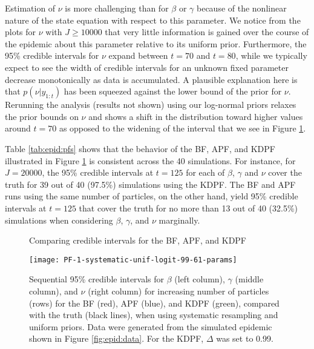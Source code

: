 Estimation of $\nu$ is more challenging than for $\beta$ or $\gamma$ because of the nonlinear nature of the state equation with respect to this parameter. We notice from the plots for $\nu$ with $J \ge 10000$ that very little information is gained over the course of the epidemic about this parameter relative to its uniform prior. Furthermore, the 95\% credible intervals for $\nu$ expand between $t = 70$ and $t = 80$, while we typically expect to see the width of credible intervals for an unknown fixed parameter decrease monotonically as data is accumulated. A plausible explanation here is that $p(\nu|y_{1:t})$ has been squeezed against the lower bound of the prior for $\nu$. Rerunning the analysis (results not shown) using our log-normal priors relaxes the prior bounds on $\nu$ and shows a shift in the distribution toward higher values around $t = 70$ as opposed to the widening of the interval that we see in Figure \ref{fig:epid:pfs}.

Table \ref{tab:epid:pfs} shows that the behavior of the BF, APF, and KDPF illustrated in Figure \ref{fig:epid:pfs} is consistent across the 40 simulations. For instance, for $J = 20000$, the 95\% credible intervals at $t = 125$ for each of $\beta$, $\gamma$ and $\nu$ cover the truth for 39 out of 40 (97.5\%) simulations using the KDPF. The BF and APF runs using the same number of particles, on the other hand, yield 95\% credible intervals at $t = 125$ that cover the truth for no more than 13 out of 40 (32.5\%) simulations when considering $\beta$, $\gamma$, and $\nu$ marginally.

\begin{figure}
\ssp
\centering
\caption{Comparing credible intervals for the BF, APF, and KDPF} \label{fig:epid:pfs}
\texttt{[image: PF-1-systematic-unif-logit-99-61-params]}
\caption*{Sequential 95\% credible intervals for $\beta$ (left column), $\gamma$ (middle column), and $\nu$ (right column) for increasing number of particles (rows) for the BF (red), APF (blue), and KDPF (green), compared with the truth (black lines), when using systematic resampling and uniform priors. Data were generated from the simulated epidemic shown in Figure \ref{fig:epid:data}. For the KDPF, $\Delta$ was set to 0.99.}
\end{figure}

